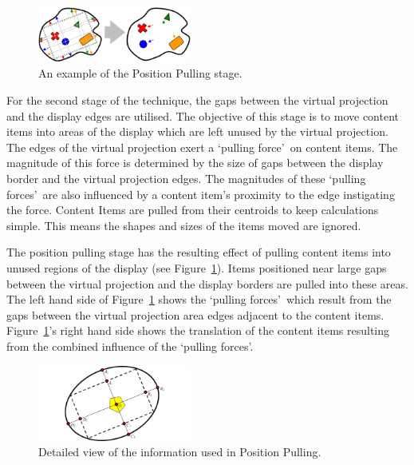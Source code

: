 \documentclass[review,5p,times,twocolumn]{elsarticle}
\begin{document}
\begin{figure}[h] 
 \centering
   \includegraphics[width=0.45\textwidth]{figures/virtual_rectangle_pull_example.png}
   \caption{An example of the Position Pulling stage.}
   \label{fig:pullLayout}
\end{figure}

For the second stage of the technique, the gaps between the virtual projection and the display edges are utilised.
The objective of this stage is to move content items into areas of the display which are left unused by the virtual projection.
The edges of the virtual projection exert a \lq pulling force\rq\ on content items.
The magnitude of this force is determined by the size of gaps between the display border and the virtual projection edges.
The magnitudes of these \lq pulling forces\rq\ are also influenced by a content item's proximity to the edge instigating the force.
Content Items are pulled from their centroids to keep calculations simple.
This means the shapes and sizes of the items moved are ignored.

The position pulling stage has the resulting effect of pulling content items into unused regions of the display (see
Figure~\ref{fig:pullLayout}).
Items positioned near large gaps between the virtual projection and the display borders are pulled into these areas.
The left hand side of Figure~\ref{fig:pullLayout} shows the \lq pulling forces\rq\ which result from the gaps between the virtual projection area edges adjacent to the content items.
Figure~\ref{fig:pullLayout}'s right hand side shows the translation of the content items resulting from the combined influence of the \lq pulling forces\rq .

\begin{figure}[h] 
 \centering
   \includegraphics[width=0.45\textwidth]{figures/virtual_rectangle_pull_example_detailed.png}
   \caption{Detailed view of the information used in Position Pulling.}
   \label{fig:pullLayoutExp}
\end{figure}
\end{document}
